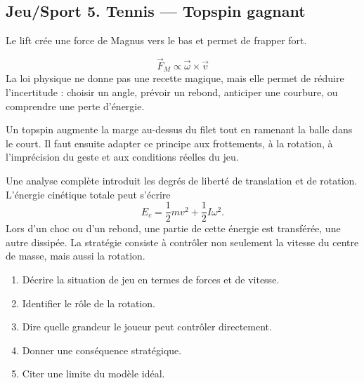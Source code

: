 \documentclass[11pt,a4paper]{article}
\begin{document}
\subsection{Jeu/Sport 5. Tennis — Topspin gagnant}

\begin{exemplebox}[Observation]
Le lift crée une force de Magnus vers le bas et permet de frapper fort.
\end{exemplebox}

\begin{theorembox}
\[
\vec F_M\propto \vec\omega\times\vec v
\]
La loi physique ne donne pas une recette magique, mais elle permet de réduire l'incertitude : choisir un angle, prévoir un rebond, anticiper une courbure, ou comprendre une perte d'énergie.
\end{theorembox}

\begin{methodebox}
Un topspin augmente la marge au-dessus du filet tout en ramenant la balle dans le court.
Il faut ensuite adapter ce principe aux frottements, à la rotation, à l'imprécision du geste et aux conditions réelles du jeu.
\end{methodebox}

\begin{approfondissementbox}
Une analyse complète introduit les degrés de liberté de translation et de rotation. L'énergie cinétique totale peut s'écrire
\[
E_c=\frac12mv^2+\frac12I\omega^2.
\]
Lors d'un choc ou d'un rebond, une partie de cette énergie est transférée, une autre dissipée. La stratégie consiste à contrôler non seulement la vitesse du centre de masse, mais aussi la rotation.
\end{approfondissementbox}

\begin{exercicebox}
\begin{enumerate}
  \item Décrire la situation de jeu en termes de forces et de vitesse.
  \item Identifier le rôle de la rotation.
  \item Dire quelle grandeur le joueur peut contrôler directement.
  \item Donner une conséquence stratégique.
  \item Citer une limite du modèle idéal.
\end{enumerate}
\end{exercicebox}
\end{document}

